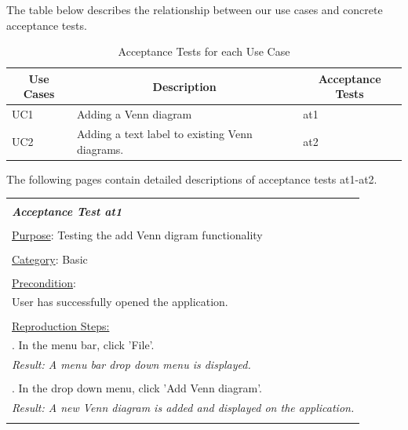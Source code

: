 \documentclass[fontsize=12pt,paper=letter,twoside]{scrartcl}
\begin{document}
The table below describes the relationship between our use cases and concrete acceptance tests.

\begin{table}[!ht]
	\centering
	\begin{tabular}{|l|l|l|}
		\hline
		\multicolumn{1}{|c|}{\textbf{Use Cases}} & \multicolumn{1}{c|}{\textbf{Description}}                                    & \multicolumn{1}{c|}{\textbf{Acceptance Tests}} \\ \hline
		UC1                                      & Adding a Venn diagram                  & at1                                            \\ \hline
		UC2                                      & Adding a text label to existing Venn diagrams.                        			     & at2                                            \\ \hline
	\end{tabular}
	\caption{Acceptance Tests for each Use Case}
	\label{acceptance-tests}
\end{table}

The following pages contain detailed descriptions of acceptance tests at1-at2.

\begin{table}[!h]
	\begin{tabular}{|l|}
		\hline
		\\
		\textbf{\emph{Acceptance Test at1}} 	
		\\\\
		\underline{Purpose}: Testing the add Venn digram functionality						\\
		\\
		\underline{Category}: Basic															\\
		\\
		\underline{Precondition}:															\\ \qquad
		User has successfully opened the application.										\\
		\\
		\underline{Reproduction Steps:}
		\\ \qquad 1. In the menu bar, click 'File'.
		\\ \qquad \textit{Result: A menu bar drop down menu is displayed. }
		\\\\ \qquad 2. In the drop down menu, click 'Add Venn diagram'.
		\\ \qquad \textit{Result: A new Venn diagram is added and displayed on the application.}
		\\\\
		\hline
	\end{tabular}
\end{table}
\end{document}
